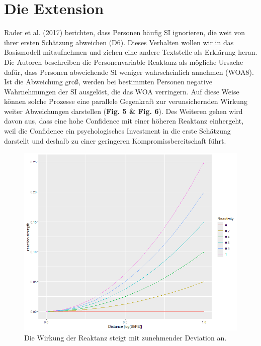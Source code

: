 \documentclass[
  man,mask,floatsintext]{apa6}
\begin{document}
\section{Die Extension}\label{die-extension}

Rader et al. (2017) berichten, dass Personen häufig SI ignorieren, die weit von ihrer ersten Schätzung abweichen (D6). Dieses Verhalten wollen wir in das Basismodell mitaufnehmen und ziehen eine andere Textstelle als Erklärung heran. Die Autoren beschreiben die Personenvariable Reaktanz als mögliche Ursache dafür, dass Personen abweichende SI weniger wahrscheinlich annehmen (WOA8). Ist die Abweichung groß, werden bei bestimmten Personen negative Wahrnehmungen der SI ausgelöst, die das WOA verringern. Auf diese Weise können solche Prozesse eine parallele Gegenkraft zur verunsichernden Wirkung weiter Abweichungen darstellen (\textbf{Fig. 5 \& Fig. 6}). Des Weiteren gehen wird davon aus, dass eine hohe Confidence mit einer höheren Reaktanz einhergeht, weil die Confidence ein psychologisches Investment in die erste Schätzung darstellt und deshalb zu einer geringeren Kompromissbereitschaft führt.



\begin{figure}
\centering
\includegraphics{Abbildungen/ext_react_dist.png}
\caption{\label{fig:my-figure5}Die Wirkung der Reaktanz steigt mit zunehmender Deviation an.}
\end{figure}
\end{document}
